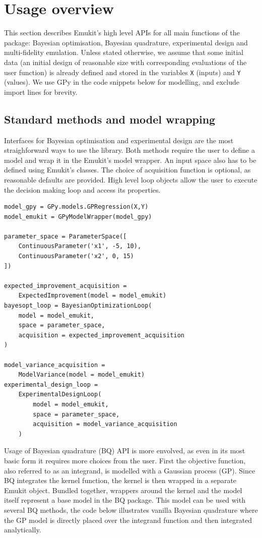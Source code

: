 \section{Usage overview}\label{sec:usage}
This section describes Emukit's high level APIs for all main functions of the package: Bayesian optimisation, Bayesian quadrature, experimental design and multi-fidelity emulation. Unless stated otherwise, we assume that some initial data (an initial design of reasonable size with corresponding evaluations of the user function) is already defined and stored in the variables \texttt{X} (inputs) and \texttt{Y} (values). We use GPy \cite{gpy2014} in the code snippets below for modelling, and exclude import lines for brevity.

\subsection{Standard methods and model wrapping}

Interfaces for Bayesian optimisation and experimental design are the most straighforward ways to use the library. Both methods require the user to define a model and wrap it in the Emukit's model wrapper. An input space also has to be defined using Emukit's classes. The choice of acquisition function is optional, as reasonable defaults are provided. High level loop objects allow the user to execute the decision making loop and access its properties.

\begin{verbatim}
model_gpy = GPy.models.GPRegression(X,Y)
model_emukit = GPyModelWrapper(model_gpy)

parameter_space = ParameterSpace([
    ContinuousParameter('x1', -5, 10),
    ContinuousParameter('x2', 0, 15)
])

expected_improvement_acquisition =
    ExpectedImprovement(model = model_emukit)
bayesopt_loop = BayesianOptimizationLoop(
    model = model_emukit,
    space = parameter_space,
    acquisition = expected_improvement_acquisition
)

model_variance_acquisition =
    ModelVariance(model = model_emukit)
experimental_design_loop =
    ExperimentalDesignLoop(
        model = model_emukit,
        space = parameter_space,
        acquisition = model_variance_acquisition
    )
\end{verbatim}

Usage of Bayesian quadrature (BQ) API is more envolved, as even in its most basic form it requires more choices from the user. First the objective function, also referred to as an integrand, is modelled with a Gaussian process (GP). Since BQ integrates the kernel function, the kernel is then wrapped in a separate Emukit object. Bundled together, wrappers around the kernel and the model itself represent a base model in the BQ package. This model can be used with several BQ methods, the code below illustrates vanilla Bayesian quadrature where the GP model is directly placed over the integrand function and then integrated analytically.

